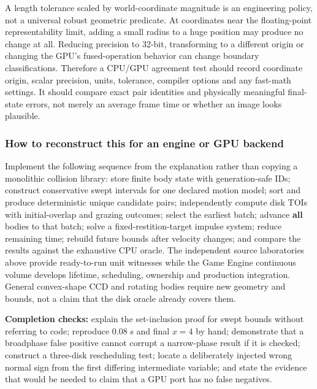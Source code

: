 A length tolerance scaled by world-coordinate magnitude is an engineering policy, not a universal robust geometric predicate. At coordinates near the floating-point representability limit, adding a small radius to a huge position may produce no change at all. Reducing precision to 32-bit, transforming to a different origin or changing the GPU's fused-operation behavior can change boundary classifications. Therefore a CPU/GPU agreement test should record coordinate origin, scalar precision, units, tolerance, compiler options and any fast-math settings. It should compare exact pair identities and physically meaningful final-state errors, not merely an average frame time or whether an image looks plausible.

\subsubsection{How to reconstruct this for an engine or GPU backend}\label{04-visual-computing-ii-ch026-how-to-reconstruct-this-for-an-engine-or-gpu-backend}

\hypertarget{04-visual-computing-ii-ch026-how-to-reconstruct-this-for-an-engine-or-gpu-backend}{}

Implement the following sequence from the explanation rather than copying a monolithic collision library: store finite body state with generation-safe IDs; construct conservative swept intervals for one declared motion model; sort and produce deterministic unique candidate pairs; independently compute disk TOIs with initial-overlap and grazing outcomes; select the earliest batch; advance \textbf{all} bodies to that batch; solve a fixed-restition-target impulse system; reduce remaining time; rebuild future bounds after velocity changes; and compare the results against the exhaustive CPU oracle. The independent source laboratories above provide ready-to-run unit witnesses while the Game Engine continuous volume develops lifetime, scheduling, ownership and production integration. General convex-shape CCD and rotating bodies require new geometry and bounds, not a claim that the disk oracle already covers them.

\textbf{Completion checks:} explain the set-inclusion proof for swept bounds without referring to code; reproduce \(0.08\) s and final \(x=4\) by hand; demonstrate that a broadphase false positive cannot corrupt a narrow-phase result if it is checked; construct a three-disk rescheduling test; locate a deliberately injected wrong normal sign from the first differing intermediate variable; and state the evidence that would be needed to claim that a GPU port has no false negatives.


